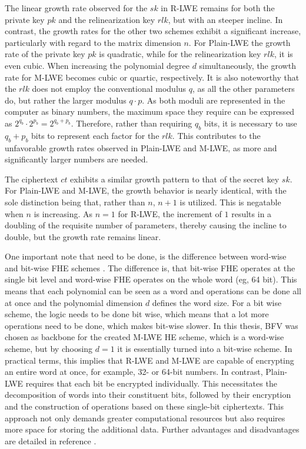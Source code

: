 The linear growth rate observed for the $sk$ in R-LWE remains for both the private key $pk$ and the relinearization key $rlk$, but with an steeper incline. In contrast, the growth rates for the other two schemes exhibit a significant increase, particularly with regard to the matrix dimension $n$. For Plain-LWE the growth rate of the private key $pk$ is quadratic, while for the relinearization key $rlk$, it is even cubic. When increasing the polynomial degree $d$ simultaneously, the growth rate for M-LWE becomes cubic or quartic, respectively. It is also noteworthy that the $rlk$ does not employ the conventional modulus $q$, as all the other parameters do, but rather the larger modulus $q\cdot p$. As both moduli are represented in the computer as binary numbers, the maximum space they require can be expressed as $2^{q_b}\cdot 2^{p_b} = 2^{q_b+p_b}$. Therefore, rather than requiring $q_b$ bits, it is necessary to use $q_b+p_b$ bits to represent each factor for the $rlk$. This contributes to the unfavorable growth rates observed in Plain-LWE and M-LWE, as more and significantly larger numbers are needed.

The ciphertext $ct$ exhibits a similar growth pattern to that of the secret key $sk$. For Plain-LWE and M-LWE, the growth behavior is nearly identical, with the sole distinction being that, rather than $n$, $n+1$ is utilized. This is negatable when $n$ is increasing. As $n=1$ for R-LWE, the increment of $1$ results in a doubling of the requisite number of parameters, thereby causing the incline to double, but the growth rate remains linear.

One important note that need to be done, is the difference between word-wise and bit-wise FHE schemes \cite{WordBitWiseFhe}. The difference is, that bit-wise FHE operates at the single bit level and word-wise FHE operates on the whole word (eg, 64 bit). This means that each polynomial can be seen as a word and operations can be done all at once and the polynomial dimension $d$ defines the word size. For a bit wise scheme, the logic needs to be done bit wise, which means that a lot more operations need to be done, which makes bit-wise slower. In this thesis, BFV was chosen as backbone for the created M-LWE HE scheme, which is a word-wise scheme, but by choosing $d=1$ it is essentially turned into a bit-wise scheme. In practical terms, this implies that R-LWE and M-LWE are capable of encrypting an entire word at once, for example, 32- or 64-bit numbers. In contrast, Plain-LWE requires that each bit be encrypted individually. This necessitates the decomposition of words into their constituent bits, followed by their encryption and the construction of operations based on these single-bit ciphertexts. This approach not only demands greater computational resources but also requires more space for storing the additional data. Further advantages and disadvantages are detailed in reference \cite{WordBitWiseFhe}. 

